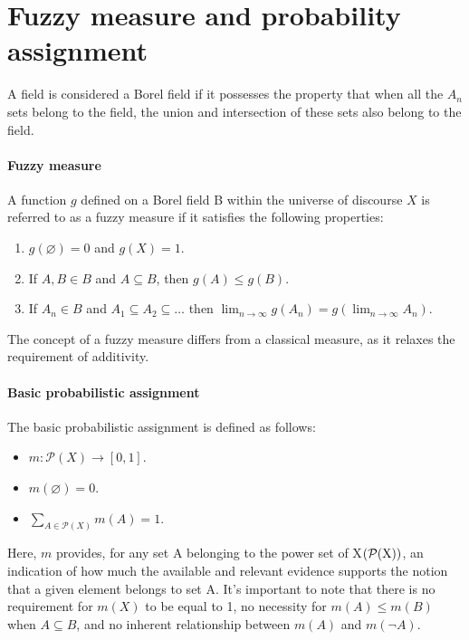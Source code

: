 \section{Fuzzy measure and probability assignment}

\begin{definition}
    A field is considered a Borel field if it possesses the property that when all the $A_n$ sets belong to the field, the union and intersection of these sets also belong to the field. 
\end{definition}

\paragraph*{Fuzzy measure}
A function $g$ defined on a Borel field B within the universe of discourse $X$ is referred to as a fuzzy measure if it satisfies the following properties:
\begin{enumerate}
    \item $g(\varnothing)=0$ and $g(X)=1$.
    \item If $A,B \in B$ and $A \subseteq B$, then $g(A) \leq g(B)$.
    \item If $A_n \in B$ and $A_1 \subseteq A_2 \subseteq \dots$ then $\lim_{n \to \infty}g(A_n)=g\left(\lim_{n \to \infty}A_n\right)$.
\end{enumerate}
The concept of a fuzzy measure differs from a classical measure, as it relaxes the requirement of additivity.

\paragraph*{Basic probabilistic assignment}
The basic probabilistic assignment is defined as follows:
\begin{itemize}
    \item $m:\mathcal{P}(X) \rightarrow [0,1]$.
    \item $m(\varnothing)=0$.
    \item $\sum_{A \in \mathcal{P}(X)}m(A)=1$.
\end{itemize}
Here, $m$ provides, for any set A belonging to the power set of X$(\mathcal{P}(\textnormal{X}))$, an indication of how much the available and relevant evidence supports the notion that a given element belongs to set A.
It's important to note that there is no requirement for $m(X)$ to be equal to 1, no necessity for $m(A) \leq m(B)$ when $A\subseteq B$, and no inherent relationship between $m(A)$ and $m(\lnot A)$.